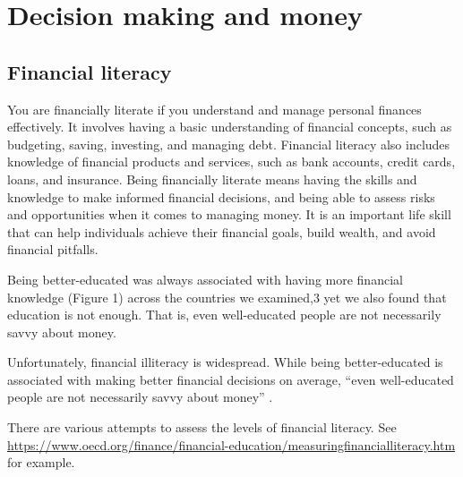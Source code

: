 \documentclass[
  12pt,
  oneside]{book}
\theoremstyle{definition}
\theoremstyle{definition}
\theoremstyle{definition}
\theoremstyle{definition}
\theoremstyle{remark}
\begin{document}
\section{Decision making and money}\label{decision-making-and-money}

\subsection{Financial literacy}\label{financial-literacy}

You are financially literate if you understand and manage personal finances effectively. It involves having a basic understanding of financial concepts, such as budgeting, saving, investing, and managing debt. Financial literacy also includes knowledge of financial products and services, such as bank accounts, credit cards, loans, and insurance.
Being financially literate means having the skills and knowledge to make informed financial decisions, and being able to assess risks and opportunities when it comes to managing money. It is an important life skill that can help individuals achieve their financial goals, build wealth, and avoid financial pitfalls.

Being better-educated was always associated with having more financial knowledge (Figure
1) across the countries we examined,3 yet we also found that education is not enough. That
is, even well-educated people are not necessarily savvy about money.

Unfortunately, financial illiteracy is widespread. While being better-educated is associated with making better financial decisions on average, ``even well-educated people are not necessarily savvy about money'' \citep[p.~3]{Mitchell2015Financial}.

There are various attempts to assess the levels of financial literacy. See \url{https://www.oecd.org/finance/financial-education/measuringfinancialliteracy.htm} for example.
\end{document}
